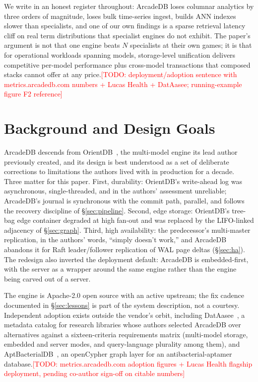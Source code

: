 \documentclass[conference]{IEEEtran}
\newcommand{\todo}[1]{\textcolor{red}{[TODO: #1]}}
\newcommand{\arcadedb}{ArcadeDB}
\begin{document}
We write in an honest register throughout: \arcadedb{} loses columnar
analytics by three orders of magnitude, loses bulk time-series ingest, builds
ANN indexes slower than specialists, and one of our own findings is a sparse
retrieval latency cliff on real term distributions that specialist engines do
not exhibit. The paper's argument is not that one engine beats $N$
specialists at their own games; it is that for operational workloads spanning
models, storage-level unification delivers competitive per-model performance
plus cross-model transactions that composed stacks cannot offer at any
price.\todo{deployment/adoption sentence with metrics.arcadedb.com numbers +
Lucas Health + DatAasee; running-example figure F2 reference}

\section{Background and Design Goals}\label{sec:background}

\arcadedb{} descends from OrientDB~\cite{ritter2021orientdb}, the multi-model
engine its lead author previously created, and its design is best understood
as a set of deliberate corrections to limitations the authors lived with in
production for a decade. Three matter for this paper. First, durability:
OrientDB's write-ahead log was asynchronous, single-threaded, and in the
authors' assessment unreliable; \arcadedb{}'s journal is synchronous with the
commit path, parallel, and follows the recovery discipline of
\S\ref{sec:pipeline}. Second, edge storage: OrientDB's tree-bag edge
container degraded at high fan-out and was replaced by the LIFO-linked
adjacency of \S\ref{sec:graph}. Third, high availability: the predecessor's
multi-master replication, in the authors' words, ``simply doesn't work,''
and \arcadedb{} abandons it for Raft leader/follower replication of WAL page
deltas (\S\ref{sec:ha}). The redesign also inverted the deployment default:
\arcadedb{} is embedded-first, with the server as a wrapper around the same
engine rather than the engine being carved out of a server.

The engine is Apache-2.0 open source with an active upstream; the fix
cadence documented in \S\ref{sec:lessons} is part of the system description,
not a courtesy. Independent adoption exists outside the vendor's orbit,
including DatAasee~\cite{himpe2024dataasee}, a metadata catalog for research
libraries whose authors selected \arcadedb{} over alternatives against a
sixteen-criteria requirements matrix (multi-model storage, embedded and
server modes, and query-language plurality among them), and
AptBacterialDB~\cite{aptbacterialdb}, an openCypher graph layer for an
antibacterial-aptamer database.\todo{metrics.arcadedb.com adoption figures +
Lucas Health flagship deployment, pending co-author sign-off on citable
numbers}
\end{document}
